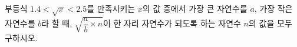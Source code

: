 부등식 $1.4<\sqrt{x}<2.5$를 만족시키는 $x$의 값 중에서 가장 큰 자연수를 $a$, 가장 작은 자연수를 $b$라 할 때, $\sqrt{\dfrac{a}{b}\times n}$이 한 자리 자연수가 되도록 하는 자연수 $n$의 값을 모두 구하시오.
